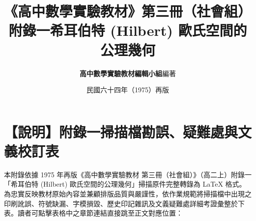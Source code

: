 \documentclass[a4paper,12pt,twoside]{article}
\title{\LARGE\textbf{《高中數學實驗教材》第三冊（社會組）}\\[0.5em] \Large\textbf{附錄一\quad 希耳伯特 (Hilbert) 歐氏空間的公理幾何}}
\author{\textbf{高中數學實驗教材編輯小組}\quad 編著}
\date{民國六十四年（1975）再版}
\begin{document}
\maketitle
\thispagestyle{firstpage}

\section*{【說明】附錄一掃描檔勘誤、疑難處與文義校訂表}
\label{sec:errata_notes_b3_a1}
\label{sec:current_errata}

本附錄依據 1975 年再版《高中數學實驗教材 第三冊（社會組）》（高二上）附錄一「希耳伯特 (Hilbert) 歐氏空間的公理幾何」掃描原件完整轉錄為 \LaTeX{} 格式。為忠實反映教材原始內容並兼顧排版品質與嚴謹性，依作業規範將掃描檔中出現之印刷訛誤、符號缺漏、字模損毀、歷史印記雜訊及文義疑難處詳細考證彙整於下表。讀者可點擊表格中之章節連結直接跳至正文對應位置：
\end{document}

